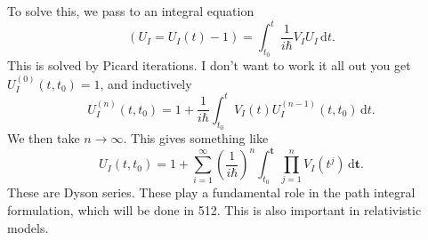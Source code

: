 To solve this, we pass to an integral equation
\[
	(U_I=U_I(t)-1) = \int_{t_0} ^t \frac{1}{i\hbar} V_IU_I \,\mathrm{d} t
.\]
This is solved by Picard iterations. I don't want to work it all out you get $U_I^{(0)} (t,t_0)=1$, and inductively
\[
	U^{(n)} _I(t,t_0)=1+ \frac{1}{i\hbar} \int_{t_0}^{t} V_I(t)U_I^{(n-1)} (t,t_0) \,\mathrm{d} t
.\]
We then take $n\to \infty $. This gives something like
\[
	U_I(t,t_0)=1+\sum_{i=1}^{\infty } \left( \frac{1}{i\hbar}  \right) ^n \int_{t_0}^{\mathbf{t} } \prod_{j=1} ^n V_I(t^j) \,\mathrm{d} \mathbf{t} 
.\]
These are Dyson series. These play a fundamental role in the path integral formulation, which will be done in 512. This is also important in relativistic models.
